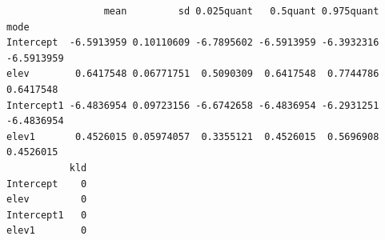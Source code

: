 \documentclass[
  letterpaper,
  DIV=11,
  numbers=noendperiod]{scrartcl}
\newenvironment{Shaded}{\begin{snugshade}}{\end{snugshade}}
\newcommand{\CommentTok}[1]{\textcolor[rgb]{0.37,0.37,0.37}{#1}}
\newcommand{\FunctionTok}[1]{\textcolor[rgb]{0.28,0.35,0.67}{#1}}
\newcommand{\NormalTok}[1]{\textcolor[rgb]{0.00,0.23,0.31}{#1}}
\newcommand{\OtherTok}[1]{\textcolor[rgb]{0.00,0.23,0.31}{#1}}
\newcommand{\SpecialCharTok}[1]{\textcolor[rgb]{0.37,0.37,0.37}{#1}}
\begin{document}
\begin{tcolorbox}
\begin{Shaded}
\end{Shaded}

\begin{verbatim}
                 mean         sd 0.025quant   0.5quant 0.975quant       mode
Intercept  -6.5913959 0.10110609 -6.7895602 -6.5913959 -6.3932316 -6.5913959
elev        0.6417548 0.06771751  0.5090309  0.6417548  0.7744786  0.6417548
Intercept1 -6.4836954 0.09723156 -6.6742658 -6.4836954 -6.2931251 -6.4836954
elev1       0.4526015 0.05974057  0.3355121  0.4526015  0.5696908  0.4526015
           kld
Intercept    0
elev         0
Intercept1   0
elev1        0
\end{verbatim}

\end{tcolorbox}
\end{document}
